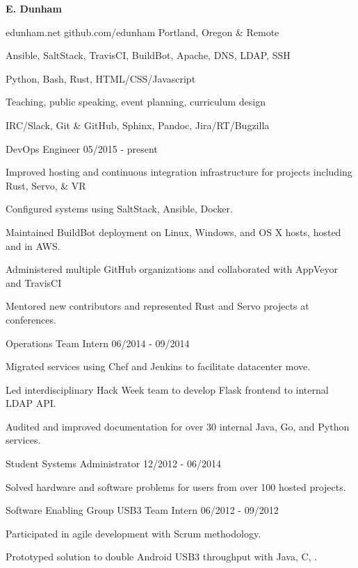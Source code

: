 \documentclass[11pt]{article} %
\begin{document}
\centerline{{\Huge \bf E. Dunham}}

\bigskip

        {edunham.net}
        {github.com/edunham}
        {Portland, Oregon \& Remote}


      {Ansible, SaltStack, TravisCI, BuildBot, Apache, DNS, LDAP, SSH}

      {Python, Bash, Rust, HTML/CSS/Javascript}

      {Teaching, public speaking, event planning, curriculum design}

      {IRC/Slack, Git \& GitHub, Sphinx, Pandoc, Jira/RT/Bugzilla}



\begin{description}
\squish
{}
           {DevOps Engineer}
           {05/2015 - present}

Improved hosting and continuous integration infrastructure for projects
including Rust, Servo, \& VR

Configured systems using SaltStack, Ansible, Docker.

Maintained BuildBot deployment on Linux, Windows, and OS X hosts, hosted and
in AWS.


Administered multiple GitHub organizations and collaborated with AppVeyor and
TravisCI

Mentored new contributors and represented Rust and Servo projects at
conferences.

           {Operations Team Intern}
           {06/2014 - 09/2014}

Migrated services using Chef and Jenkins to facilitate datacenter move.

Led interdisciplinary Hack Week team to develop Flask frontend to internal
LDAP API.

Audited and improved documentation for over 30 internal Java, Go, and Python
services.

           {Student Systems Administrator}
           {12/2012 - 06/2014}

Solved hardware and software problems for users from over 100 hosted projects.

           {Software Enabling Group USB3 Team Intern}
           {06/2012 - 09/2012}

Participated in agile development with Scrum methodology.

Prototyped solution to double Android USB3 throughput with Java, C, \CPP.

\end{description}
\end{document}
